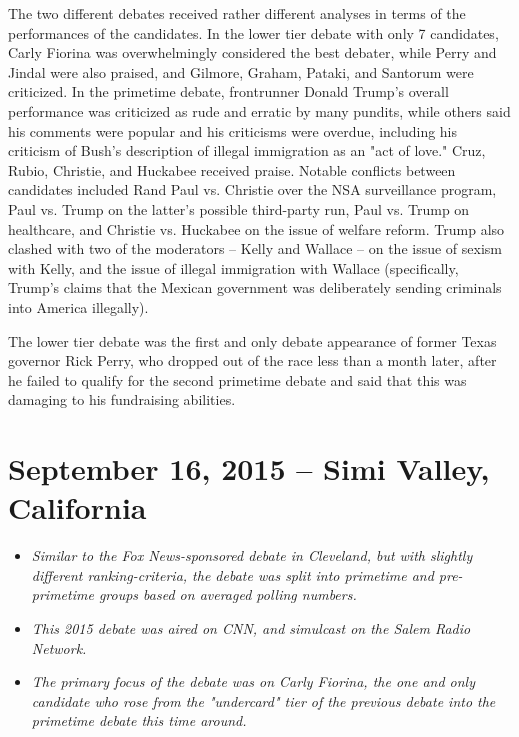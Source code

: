 The two different debates received rather different analyses in terms of
the performances of the candidates. In the lower tier debate with only 7
candidates, Carly Fiorina was overwhelmingly considered the best
debater, while Perry and Jindal were also praised, and Gilmore, Graham,
Pataki, and Santorum were criticized. In the primetime debate,
frontrunner Donald Trump's overall performance was criticized as rude
and erratic by many pundits, while others said his comments were popular
and his criticisms were overdue, including his criticism of Bush's
description of illegal immigration as an "act of love." Cruz, Rubio,
Christie, and Huckabee received praise. Notable conflicts between
candidates included Rand Paul vs. Christie over the NSA surveillance
program, Paul vs. Trump on the latter's possible third-party run, Paul
vs. Trump on healthcare, and Christie vs. Huckabee on the issue of
welfare reform. Trump also clashed with two of the moderators -- Kelly
and Wallace -- on the issue of sexism with Kelly, and the issue of
illegal immigration with Wallace (specifically, Trump's claims that the
Mexican government was deliberately sending criminals into America
illegally).

The lower tier debate was the first and only debate appearance of former
Texas governor Rick Perry, who dropped out of the race less than a month
later, after he failed to qualify for the second primetime debate and
said that this was damaging to his fundraising abilities.

\section{September 16, 2015 -- Simi Valley,
California}\label{september-16-2015-simi-valley-california}

\begin{itemize}
\item
  \emph{Similar to the Fox News-sponsored debate in Cleveland, but with
  slightly different ranking-criteria, the debate was split into
  primetime and pre-primetime groups based on averaged polling numbers.}
\item
  \emph{This 2015 debate was aired on CNN, and simulcast on the Salem
  Radio Network.}
\item
  \emph{The primary focus of the debate was on Carly Fiorina, the one
  and only candidate who rose from the "undercard" tier of the previous
  debate into the primetime debate this time around.}
\end{itemize}

